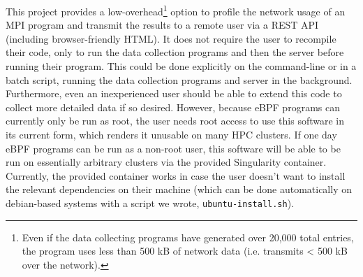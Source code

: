 
This project provides a low-overhead\footnote{Even if the data collecting programs have generated over 20,000 total entries, the program uses less than 500 kB of network data (i.e. transmits < 500 kB over the network).} option to profile the network usage of an MPI program and transmit the results to a remote user via a REST API (including browser-friendly HTML). It does not require the user to recompile their code, only to run the data collection programs and then the server before running their program. This could be done explicitly on the command-line or in a batch script, running the data collection programs and server in the background. Furthermore, even an inexperienced user should be able to extend this code to collect more detailed data if so desired. However, because eBPF programs can currently only be run as root, the user needs root access to use this software in its current form, which renders it unusable on many HPC clusters. If one day eBPF programs can be run as a non-root user, this software will be able to be run on essentially arbitrary clusters via the provided Singularity container. Currently, the provided container works in case the user doesn't want to install the relevant dependencies on their machine (which can be done automatically on debian-based systems with a script we wrote, \lstinline{ubuntu-install.sh}). 
